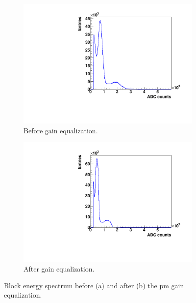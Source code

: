\begin{figure} [!h]
\begin{subfigure}[t]{0.5\textwidth}
\centering
\includegraphics[width=1\textwidth]{03_GraphicFiles/chapter3_CLaRySproto/Absorber/images_charResults_Na22/1_Raw_energy_spectrum.pdf}
\caption{Before gain equalization.}
\label{chap3::fig::absRaw_Espectrum}
\end{subfigure}
\begin{subfigure}[t]{0.5\textwidth}
\centering
\includegraphics[width=1\textwidth]{03_GraphicFiles/chapter3_CLaRySproto/Absorber/images_charResults_Na22/2_Cal_energy_spectrum.pdf}
\caption{After gain equalization.}
\label{chap3::fig::absCal_Espectrum}
\end{subfigure}
\caption{Block energy spectrum before (a) and after (b) the \gls{pm} gain equalization.}
\label{chap3::fig::absADCspectrum}
\end{figure}

